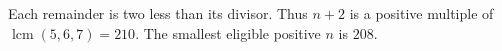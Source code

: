 Each remainder is two less than its divisor. Thus $n+2$ is a positive multiple of $\operatorname{lcm}(5,6,7)=210$. The smallest eligible positive $n$ is $\boxed{208}$.

